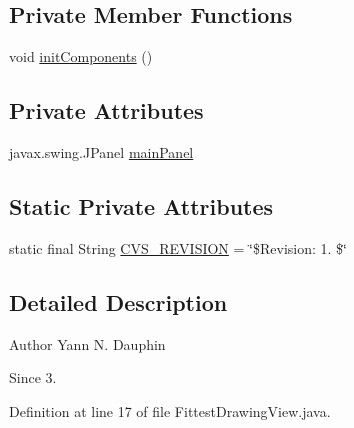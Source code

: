 \subsection*{Private Member Functions}
\begin{DoxyCompactItemize}
\item 
void \hyperlink{classexamples_1_1monalisa_1_1gui_1_1_fittest_drawing_view_acbdc4a4c627bd37fa2032aec7f51f93e}{init\-Components} ()
\end{DoxyCompactItemize}
\subsection*{Private Attributes}
\begin{DoxyCompactItemize}
\item 
javax.\-swing.\-J\-Panel \hyperlink{classexamples_1_1monalisa_1_1gui_1_1_fittest_drawing_view_aa37abc4e4fa6e42b0554dbfac39b02e9}{main\-Panel}
\end{DoxyCompactItemize}
\subsection*{Static Private Attributes}
\begin{DoxyCompactItemize}
\item 
static final String \hyperlink{classexamples_1_1monalisa_1_1gui_1_1_fittest_drawing_view_a9478a66d2827066e7842b68d10d8c9cf}{C\-V\-S\-\_\-\-R\-E\-V\-I\-S\-I\-O\-N} = \char`\"{}\$Revision\-: 1. \$\char`\"{}
\end{DoxyCompactItemize}


\subsection{Detailed Description}
\begin{DoxyAuthor}{Author}
Yann N. Dauphin 
\end{DoxyAuthor}
\begin{DoxySince}{Since}
3. 
\end{DoxySince}


Definition at line 17 of file Fittest\-Drawing\-View.\-java.



